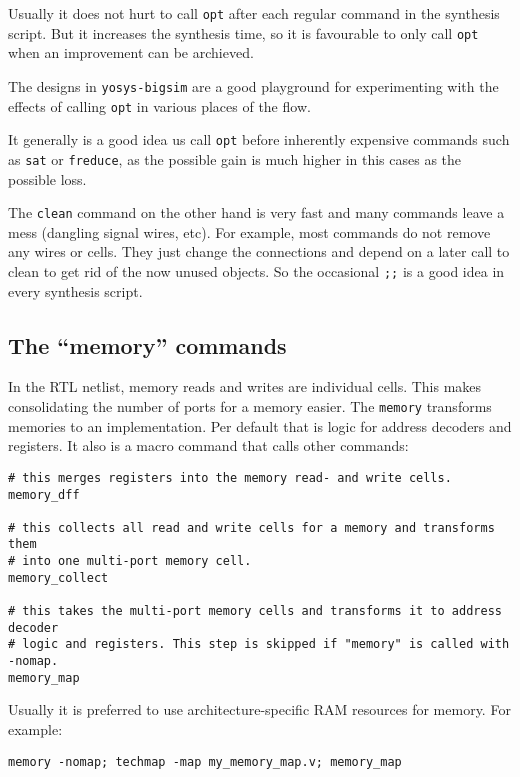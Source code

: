 \begin{frame}{\subsecname}
Usually it does not hurt to call {\tt opt} after each regular command in the
synthesis script. But it increases the synthesis time, so it is favourable
to only call {\tt opt} when an improvement can be archieved.

\bigskip
The designs in {\tt yosys-bigsim} are a good playground for experimenting with
the effects of calling {\tt opt} in various places of the flow.

\bigskip
It generally is a good idea us call {\tt opt} before inherently expensive
commands such as {\tt sat} or {\tt freduce}, as the possible gain is much
higher in this cases as the possible loss.

\bigskip
The {\tt clean} command on the other hand is very fast and many commands leave
a mess (dangling signal wires, etc). For example, most commands do not remove
any wires or cells. They just change the connections and depend on a later
call to clean to get rid of the now unused objects. So the occasional {\tt ;;}
is a good idea in every synthesis script.
\end{frame}


\subsection{The ``memory'' commands}

\begin{frame}[fragile]{\subsecname}
In the RTL netlist, memory reads and writes are individual cells. This makes
consolidating the number of ports for a memory easier. The {\tt memory}
transforms memories to an implementation. Per default that is logic for address
decoders and registers. It also is a macro command that calls other commands:

\begin{lstlisting}[xleftmargin=0.5cm, basicstyle=\ttfamily\fontsize{8pt}{10pt}\selectfont]
# this merges registers into the memory read- and write cells.
memory_dff

# this collects all read and write cells for a memory and transforms them
# into one multi-port memory cell.
memory_collect

# this takes the multi-port memory cells and transforms it to address decoder
# logic and registers. This step is skipped if "memory" is called with -nomap.
memory_map
\end{lstlisting}

\bigskip
Usually it is preferred to use architecture-specific RAM resources for memory.
For example:

\begin{lstlisting}[xleftmargin=0.5cm, basicstyle=\ttfamily\fontsize{8pt}{10pt}\selectfont]
memory -nomap; techmap -map my_memory_map.v; memory_map
\end{lstlisting}

\end{frame}

